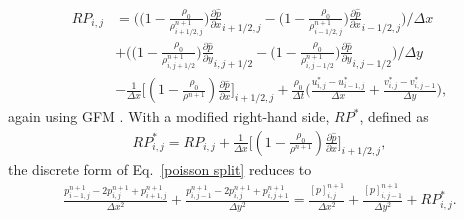 \begin{equation}
  \begin{aligned}
    RP_{i,j} &= 
    \bigg( \big(1-\frac{\rho_0}{\rho^{n+1}_{i+1/2,j}}) \frac{\partial \hat{p}}{\partial x}_{i+1/2,j}
    -      \big(1-\frac{\rho_0}{\rho^{n+1}_{i-1/2,j}}) \frac{\partial \hat{p}}{\partial x}_{i-1/2,j} \bigg) \big/\Delta x \\
    &+\bigg(\big(1-\frac{\rho_0}{\rho^{n+1}_{i,j+1/2}}) \frac{\partial \hat{p}}{\partial y}_{i,j+1/2}
    -       \big(1-\frac{\rho_0}{\rho^{n+1}_{i,j-1/2}}) \frac{\partial \hat{p}}{\partial y}_{i,j-1/2} \bigg) \big/\Delta y \\
    &- \frac{1}{\Delta x} \bigg[(1-\frac{\rho_0}{\rho^{n+1}}) \frac{\partial \hat{p}}{\partial x} \bigg]_{i+1/2,j} 
    +\frac{\rho_0}{\Delta t} \bigg( \frac{u^*_{i,j} - u^*_{i-1,j}}{\Delta x} + \frac{v^*_{i,j} - v^*_{i,j-1}}{\Delta y} \bigg),
  \end{aligned}
  \label{jump3}
\end{equation}
again using GFM \cite{Liu_JCP_2000}.  With a modified right-hand side, $RP^*$, defined as
\begin{equation}
  \begin{aligned}
    RP_{i,j}^* = RP_{i,j} + 
    \frac{1}{\Delta x} 
    \bigg[ (1-\frac{\rho_0}{\rho^{n+1}}) \frac{\partial \hat{p}}{\partial x} \bigg]_{i+1/2,j},
  \end{aligned}
  \label{jump4}
\end{equation}
the discrete form of Eq.\ \eqref{poisson split} reduces to
\begin{equation}
  \begin{aligned}
    \frac{p^{n+1}_{i-1,j}-2p^{n+1}_{i,j}+p^{n+1}_{i+1,j} }{\Delta x^2} + \frac{p^{n+1}_{i,j-1}-2p^{n+1}_{i,j}+p^{n+1}_{i,j+1} }{\Delta y^2} = 
    \frac{[p]^{n+1}_{i,j}}{\Delta x^2} + \frac{[p]^{n+1}_{i,j-1}}{\Delta y^2} + RP_{i,j}^*.
  \end{aligned}
  \label{gfm+split projection xy}
\end{equation}

